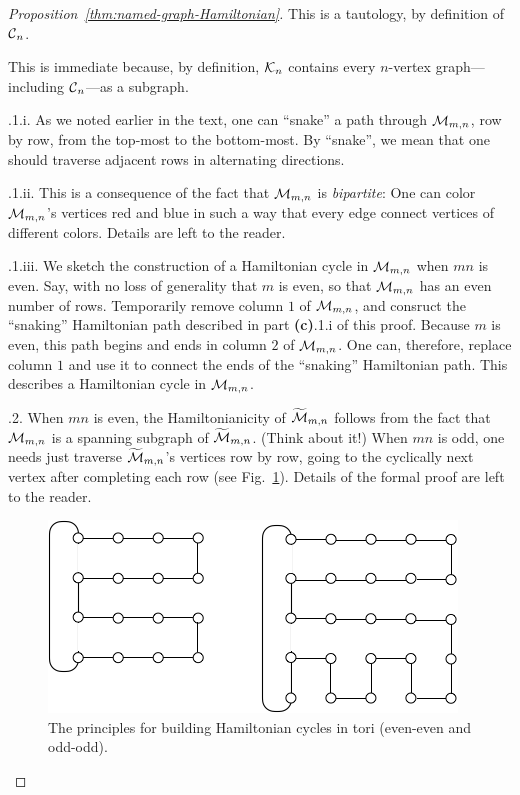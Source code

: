 \begin{proof}[Proposition~\ref{thm:named-graph-Hamiltonian}]
This is a tautology, by definition of $\mbox{$\cal C$}_n$.

\medskip

This is immediate because, by definition, $\mbox{$\cal K$}_n$ contains every
$n$-vertex graph---including $\mbox{$\cal C$}_n$---as a subgraph.

\medskip

.1.i.
As we noted earlier in the text, one can ``snake'' a path through
$\mbox{$\cal M$}_{m,n}$, row by row, from the top-most to the bottom-most.  By
``snake'', we mean that one should traverse adjacent rows in
alternating directions.

.1.ii.
This is a consequence of the fact that $\mbox{$\cal M$}_{m,n}$ is {\it bipartite}:
 One can color $\mbox{$\cal M$}_{m,n}$'s vertices red and blue
in such a way that every edge connect vertices of different colors.
Details are left to the reader.

.1.iii.
We sketch the construction of a Hamiltonian cycle in $\mbox{$\cal M$}_{m,n}$ when
$mn$ is even.  Say, with no loss of generality that $m$ is even, so
that $\mbox{$\cal M$}_{m,n}$ has an even number of rows.  Temporarily remove column
$1$ of $\mbox{$\cal M$}_{m,n}$, and consruct the ``snaking'' Hamiltonian path
described in part {\bf (c)}.1.i of this proof.  Because $m$ is even,
this path begins and ends in column $2$ of $\mbox{$\cal M$}_{m,n}$.  One can,
therefore, replace column $1$ and use it to connect the ends of the
``snaking'' Hamiltonian path.  This describes a Hamiltonian cycle in
$\mbox{$\cal M$}_{m,n}$.

.2.
When $mn$ is even, the Hamiltonianicity of $\widetilde{\mbox{$\cal M$}}_{m,n}$
follows from the fact that $\mbox{$\cal M$}_{m,n}$ is a spanning subgraph of
$\widetilde{\mbox{$\cal M$}}_{m,n}$.  (Think about it!)  When $mn$ is odd, one
needs just traverse $\widetilde{\mbox{$\cal M$}}_{m,n}$'s vertices row by row, going
to the cyclically next vertex after completing each row (see Fig.~\ref{fig:HamiltonTorus}).  
Details of the formal proof are left to the reader.
\begin{figure}[hbt]
\begin{center}
       \includegraphics[scale=0.5]{FiguresGraph/HamiltonTorus}
       \caption{The principles for building Hamiltonian cycles in tori (even-even and odd-odd).}
  \label{fig:HamiltonTorus}
\end{center}
\end{figure}


\end{proof}
